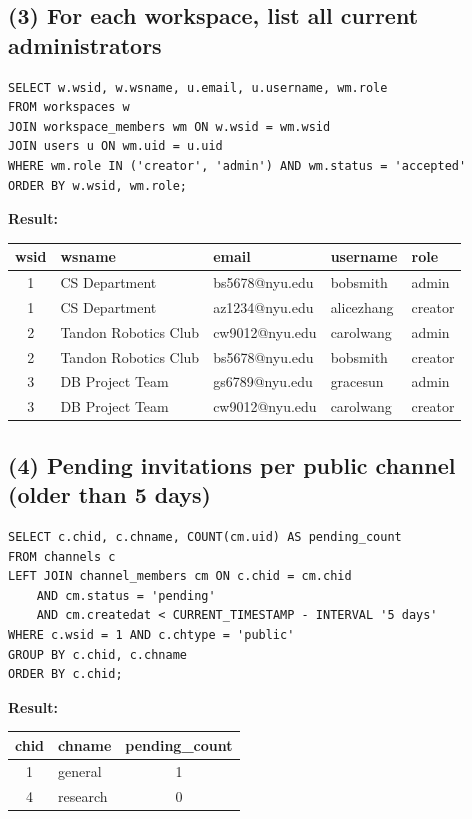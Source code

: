 \documentclass[11pt]{article}
\begin{document}
\subsection{(3) For each workspace, list all current administrators}

\begin{lstlisting}
SELECT w.wsid, w.wsname, u.email, u.username, wm.role
FROM workspaces w
JOIN workspace_members wm ON w.wsid = wm.wsid
JOIN users u ON wm.uid = u.uid
WHERE wm.role IN ('creator', 'admin') AND wm.status = 'accepted'
ORDER BY w.wsid, wm.role;
\end{lstlisting}

\noindent\textbf{Result:}
\begin{center}
\tiny
\begin{tabular}{cllll}
\toprule
wsid & wsname & email & username & role \\
\midrule
1 & CS Department & bs5678@nyu.edu & bobsmith & admin \\
1 & CS Department & az1234@nyu.edu & alicezhang & creator \\
2 & Tandon Robotics Club & cw9012@nyu.edu & carolwang & admin \\
2 & Tandon Robotics Club & bs5678@nyu.edu & bobsmith & creator \\
3 & DB Project Team & gs6789@nyu.edu & gracesun & admin \\
3 & DB Project Team & cw9012@nyu.edu & carolwang & creator \\
\bottomrule
\end{tabular}
\end{center}

\subsection{(4) Pending invitations per public channel (older than 5 days)}

\begin{lstlisting}
SELECT c.chid, c.chname, COUNT(cm.uid) AS pending_count
FROM channels c
LEFT JOIN channel_members cm ON c.chid = cm.chid
    AND cm.status = 'pending'
    AND cm.createdat < CURRENT_TIMESTAMP - INTERVAL '5 days'
WHERE c.wsid = 1 AND c.chtype = 'public'
GROUP BY c.chid, c.chname
ORDER BY c.chid;
\end{lstlisting}

\noindent\textbf{Result:}
\begin{center}
\tiny
\begin{tabular}{clc}
\toprule
chid & chname & pending\_count \\
\midrule
1 & general & 1 \\
4 & research & 0 \\
\bottomrule
\end{tabular}
\end{center}
\end{document}
